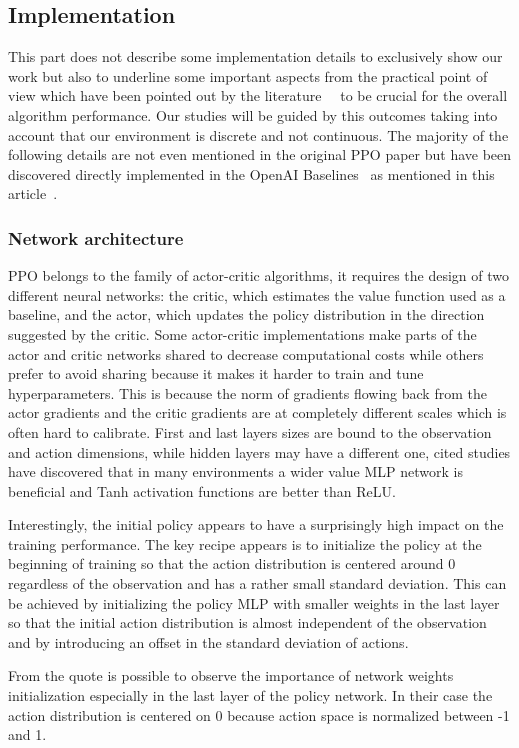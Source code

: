 \documentclass[11pt, a4paper, hidelinks]{report}
\begin{document}
\subsection{Implementation}\label{subsec:the-implementation}

This part does not describe some implementation details to exclusively show our work but also to underline some important aspects from the practical point of view which have been pointed out by the literature~\cite{ppo_implementation_1}~\cite{ppo_implementation_2} to be crucial for the overall algorithm performance.
Our studies will be guided by this outcomes taking into account that our environment is discrete and not continuous.
The majority of the following details are not even mentioned in the original PPO paper but have been discovered directly implemented in the OpenAI Baselines~\cite{ppo_baselines} as mentioned in this article~\cite{ppo-32-implementations-details}.

\subsubsection{Network architecture}

PPO belongs to the family of actor-critic algorithms, it requires the design of two different neural networks: the critic, which estimates the value function used as a baseline, and the actor, which updates the policy distribution in the direction suggested by the critic.
Some actor-critic implementations make parts of the actor and critic networks shared to decrease computational costs while others prefer to avoid sharing because it makes it harder to train and tune hyperparameters.
This is because the norm of gradients flowing back from the actor gradients and the critic gradients are at completely different scales which is often hard to calibrate.
First and last layers sizes are bound to the observation and action dimensions, while hidden layers may have a different one, cited studies have discovered that in many environments a wider value MLP network is beneficial and Tanh activation functions are better than ReLU\@.

\begin{quoting}[font=itshape, begintext={"}, endtext={"\cite{ppo_implementation_2}}]
Interestingly, the initial policy appears to have a surprisingly high impact on the training performance.
The key recipe appears is to initialize the policy at the beginning of training so that the action distribution is centered around 0
regardless of the observation and has a rather small standard deviation.
This can be achieved by initializing the policy MLP with smaller weights in the last layer so that the initial action distribution is almost independent of the observation and by introducing an offset in the standard deviation of actions.
\end{quoting}
From the quote is possible to observe the importance of network weights initialization especially in the last layer of the policy network.
In their case the action distribution is centered on 0 because action space is normalized between -1 and 1.
\end{document}

